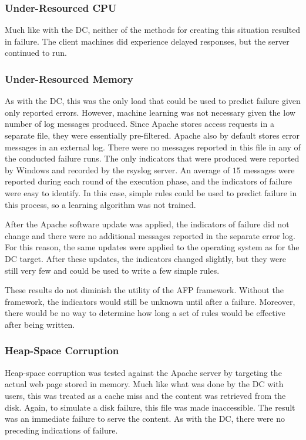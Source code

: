 \subsubsection{Under-Resourced CPU}
Much like with the \ac{DC}, neither of the methods for creating this situation
resulted in failure.  The client machines did experience delayed responses, but
the server continued to run.

\subsubsection{Under-Resourced Memory}
As with the \ac{DC}, this was the only load that could be used to predict
failure given only reported errors.  However, machine learning was not
necessary given the low number of log messages produced.  Since Apache stores
access requests in a separate file, they were essentially pre-filtered.  Apache
also by default stores error messages in an external log.  There were no
messages reported in this file in any of the conducted failure runs.  The only
indicators that were produced were reported by Windows and recorded by the
rsyslog server.  An average of $15$ messages were reported during each round of
the execution phase, and the indicators of failure were easy to identify.  In
this case, simple rules could be used to predict failure in this process, so a
learning algorithm was not trained.  

After the Apache software update was applied, the indicators of failure did not
change and there were no additional messages reported in the separate error
log.  For this reason, the same updates were applied to the operating system as
for the \ac{DC} target.  After these updates, the indicators changed slightly,
but they were still very few and could be used to write a few simple rules.

These results do not diminish the utility of the \ac{AFP} framework.  Without
the framework, the indicators would still be unknown until after a failure.
Moreover, there would be no way to determine how long a set of rules would be
effective after being written.

\subsubsection{Heap-Space Corruption}
Heap-space corruption was tested against the Apache server by targeting the
actual web page stored in memory.  Much like what was done by the \ac{DC} with
users, this was treated as a cache miss and the content was retrieved from the
disk.  Again, to simulate a disk failure, this file was made inaccessible.  The
result was an immediate failure to serve the content.  As with the \ac{DC},
there were no preceding indications of failure.


